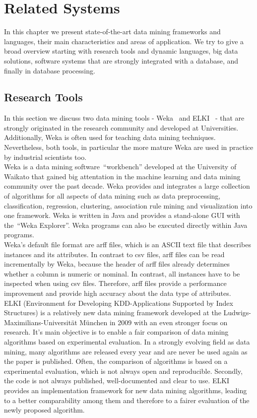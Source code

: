 \chapter{Related Systems}\label{chapter:related}

In this chapter we present state-of-the-art data mining frameworks and languages, their main characteristics and areas of application. We try to give a broad overview starting with research tools and dynamic languages, big data solutions, software systems that are strongly integrated with a database, and finally in database processing.

\section{Research Tools}
In this section we discuss two data mining tools - Weka~\parencite{Hall:2009:WDM:1656274.1656278} and ELKI~\parencite{DBLP:conf/ssdbm/AchtertKZ08} - that are strongly originated in the research community and developed at Universities. Additionally, Weka is often used for teaching data mining techniques. Nevertheless, both tools, in particular the more mature Weka are used in practice by industrial scientists too.
\\
Weka is a data mining software~\enquote{workbench} developed at the University of Waikato that gained big attentation in the machine learning and data mining community over the past decade. Weka provides and integrates a large collection of algorithms for all aspects of data mining such as data preprocessing, classification, regression, clustering, association rule mining and visualization into one framework. Weka is written in Java and provides a stand-alone GUI with the~\enquote{Weka Explorer}. Weka programs can also be executed directly within Java programs. 
\\
Weka's default file format are arff files, which is an ASCII text file that describes instances and its attributes. In contrast to csv files, arff files can be read incrementally by Weka, because the header of arff files already determines whether a column is numeric or nominal. In contrast, all instances have to be inspected when using csv files. Therefore, arff files provide a performance improvement and provide high accuracy about the data type of attributes.
\\
ELKI (Environment for Developing KDD-Applications Supported by Index Structures) is a relatively new data mining framework developed at the Ludwigs-Maximilians-Universität München in 2009 with an even stronger focus on research. It's main objective is to enable a fair comparison of data mining algorithms based on experimental evaluation. In a strongly evolving field as data mining, many algorithms are released every year and are never be used again as the paper is published. Often, the comparison of algorithms is based on a experimental evaluation, which is not always open and reproducible. Secondly, the code is not always published, well-documented and clear to use. ELKI provides an implementation framework for new data mining algorithms, leading to a better comparability among them and therefore to a fairer evaluation of the newly proposed algorithm. 
